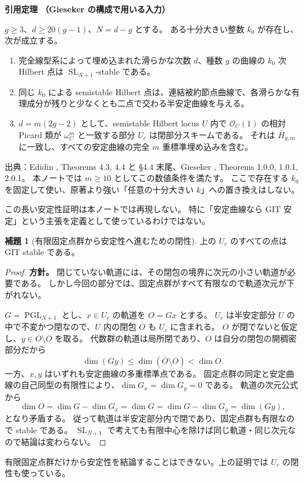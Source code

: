 \documentclass[dvipdfmx,a4paper,11pt]{article}
\theoremstyle{definition}
\newtheorem{lem}[thm]{補題}
\newcommand{\OO}{\mathcal O}\newcommand{\MM}{\mathcal M}\newcommand{\TT}{\mathcal T}
\DeclareMathOperator{\SL}{SL}\DeclareMathOperator{\PGL}{PGL}\DeclareMathOperator{\PSL}{PSL}
\newenvironment{external}[1]{\Needspace{7\baselineskip}\refstepcounter{thm}\begin{tcolorbox}[mybox,colback=blue!2,colframe=blue!40!black]\textbf{引用定理 \thethm（#1）}\par}{\end{tcolorbox}}
\begin{document}
\begin{external}{Gieseker の構成で用いる入力}\label{input:gieseker}
$g\ge3$、$d\ge20(g-1)$、$N=d-g$ とする。
ある十分大きい整数 $k_0$ が存在し、次が成立する。
\begin{enumerate}
\item 完全線型系によって埋め込まれた滑らかな次数 $d$、種数 $g$ の曲線の $k_0$ 次 Hilbert 点は $\SL_{N+1}$-stable である。
\item 同じ $k_0$ による semistable Hilbert 点は、連結被約節点曲線で、各滑らかな有理成分が残りと少なくとも二点で交わる半安定曲線を与える。
\item $d=m(2g-2)$ として、semistable Hilbert locus $U$ 内で $\OO_C(1)$ の相対 Picard 類が $\omega_C^m$ と一致する部分 $U_c$ は閉部分スキームである。
それは $\overline H_{g,m}$ に一致し、すべての安定曲線の完全 $m$ 重標準埋め込みを含む。
\end{enumerate}
出典：Edidin \cite{Edidin}, Theorems 4.3, 4.4 と \S4.4 末尾、Gieseker \cite{Gieseker}, Theorems 1.0.0, 1.0.1, 2.0.1。
本ノートでは $m\ge10$ としてこの数値条件を満たす。
ここで存在する $k_0$ を固定して使い、原著より強い「任意の十分大きい $k$」への置き換えはしない。
\end{external}
この長い安定性証明は本ノートでは再現しない。
特に「安定曲線なら GIT 安定」という主張を定義として使っているわけではない。

\begin{lem}[有限固定点群から安定性へ進むための閉性]\label{lem:closedorbits}
上の $U_c$ のすべての点は GIT stable である。
\end{lem}
\begin{proof}
\textbf{方針。} 閉じていない軌道には、その閉包の境界に次元の小さい軌道が必要である。
しかし今回の部分では、固定点群がすべて有限なので軌道次元が下がれない。

$G=\PGL_{N+1}$ とし、$x\in U_c$ の軌道を $O=Gx$ とする。
$U_c$ は半安定部分 $U$ の中で不変かつ閉なので、$U$ 内の閉包 $\overline O$ も $U_c$ に含まれる。
$O$ が閉でないと仮定し、$y\in\overline O\setminus O$ を取る。
代数群の軌道は局所閉であり、$O$ は自分の閉包の開稠密部分だから
\[
\dim(Gy)\le\dim(\overline O\setminus O)<\dim O.
\]
一方、$x,y$ はいずれも安定曲線の多重標準点である。
固定点群の同定と安定曲線の自己同型の有限性により、$\dim G_x=\dim G_y=0$ である。
軌道の次元公式から
\[
\dim O=\dim G-\dim G_x=\dim G
=\dim G-\dim G_y=\dim(Gy),
\]
となり矛盾する。
従って軌道は半安定部分内で閉であり、固定点群も有限なので stable である。
$\SL_{N+1}$ で考えても有限中心を除けば同じ軌道・同じ次元なので結論は変わらない。
\end{proof}
有限固定点群だけから安定性を結論することはできない。上の証明では $U_c$ の閉性も使っている。
\end{document}
